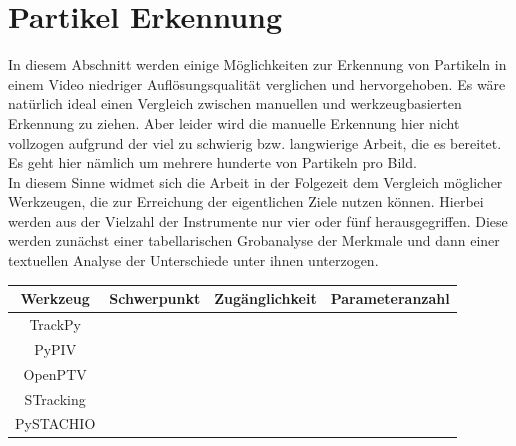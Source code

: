 \chapter{Partikel Erkennung}

In diesem  Abschnitt werden einige Möglichkeiten zur Erkennung von Partikeln in einem Video niedriger Auflösungsqualität verglichen und hervorgehoben. Es wäre natürlich ideal einen Vergleich zwischen manuellen und werkzeugbasierten Erkennung zu ziehen. Aber leider wird die manuelle Erkennung hier nicht vollzogen aufgrund der viel zu schwierig bzw. langwierige Arbeit, die es bereitet. Es geht hier nämlich um mehrere hunderte von Partikeln pro Bild. 
\\

In diesem Sinne widmet sich die Arbeit in der Folgezeit dem Vergleich möglicher Werkzeugen, die zur Erreichung der eigentlichen Ziele nutzen können. Hierbei werden aus der Vielzahl der Instrumente nur vier oder fünf herausgegriffen. Diese werden zunächst einer tabellarischen Grobanalyse der Merkmale und dann einer textuellen Analyse der Unterschiede unter ihnen unterzogen. \\


\begin{tabular}{|c||c|c|l|}
\hline
Werkzeug & Schwerpunkt & Zugänglichkeit & Parameteranzahl \\
\hline
\hline
 TrackPy & & & \\
 \hline
 PyPIV   & & & \\
 \hline
 OpenPTV & & & \\
 \hline
 STracking  & & & \\
 \hline
 PySTACHIO  & & & \\
 \hline
\end{tabular}



